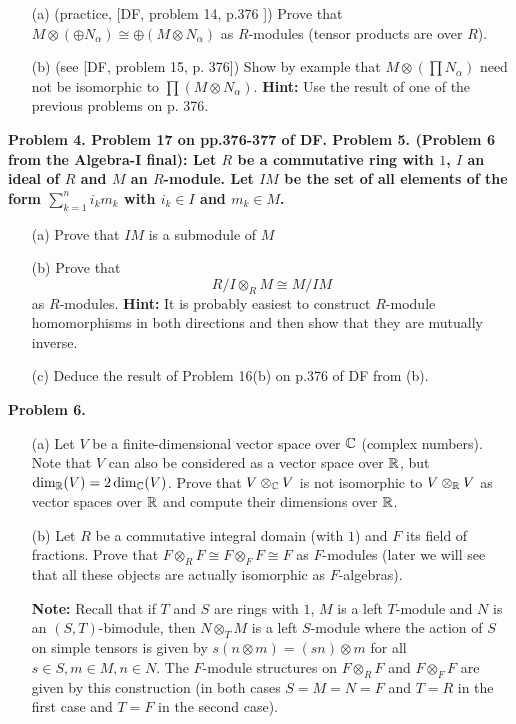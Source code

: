 \documentclass[12pt]{amsart}
\begin{document}
\begin{itemize}
\item[(a)] (practice, [DF, problem 14, p.376 ]) Prove that $M\otimes (\oplus N_{\alpha})\cong \oplus (M\otimes N_{\alpha})$ as $R$-modules (tensor products are over $R$).

\item[(b)] (see [DF, problem 15, p. 376]) Show by example that $M\otimes (\prod N_{\alpha})$ need not be isomorphic to $\prod (M\otimes N_{\alpha})$. {\bf Hint:} Use the result of one of the previous problems on p. 376.
\end{itemize}
\bf{Problem 4. }\rm Problem 17 on pp.376-377 of DF. 
\skv
\bf{Problem 5. }\rm (Problem 6 from the Algebra-I final): 
Let $R$ be a commutative ring with $1$, $I$ an ideal of $R$ and 
$M$ an $R$-module. Let $IM$ be the set of all elements of the form $\sum_{k=1}^n i_k m_k$ with $i_k\in I$ and $m_k\in M$.
\begin{itemize}
\item[(a)] Prove that $IM$ is a submodule of $M$
\item[(b)] Prove that
$$R/I\otimes_R M\cong M/IM$$
as $R$-modules. {\bf Hint:} It is probably easiest to construct $R$-module
homomorphisms in both directions and then show that they are mutually inverse.
\item[(c)] Deduce the result of Problem 16(b) on p.376 of DF from (b).
\end{itemize}
\newpage

\bf{Problem 6. }\rm 
\begin{itemize}
\item[(a)] Let $V$ be a finite-dimensional vector space over ${\mathbb C}$
(complex numbers). Note that $V$ can also be considered as a vector space over ${\mathbb R}$,
but $\dim_{{\mathbb R}} (V)=2 \dim_{{\mathbb C}}(V)$. Prove that $V\otimes_{{\mathbb C}} V$ is not isomorphic
to $V\otimes_{{\mathbb R}} V$ as vector spaces over ${\mathbb R}$ and compute their dimensions over ${\mathbb R}$.

\item[(b)] Let $R$ be a commutative integral domain (with $1$) and $F$ its field of fractions. Prove that
$F\otimes_{R} F\cong F\otimes_{F} F\cong F$ as $F$-modules (later we will see that all these objects are actually isomorphic as $F$-algebras).

\skv

{\bf Note:} Recall that if $T$ and $S$ are rings with $1$,
$M$ is a left $T$-module and $N$ is an $(S,T)$-bimodule, then $N\otimes_T M$ is a left $S$-module where the action of $S$
on simple tensors is given by $s(n\otimes m)=(sn)\otimes m$ for all $s\in S, m\in M, n\in N$. The $F$-module structures on $F\otimes_{R} F$ and
$F\otimes_{F} F$ are given by this construction (in both cases $S=M=N=F$ and $T=R$ in the first case and $T=F$ in the second case).
\end{itemize}
\end{document}
